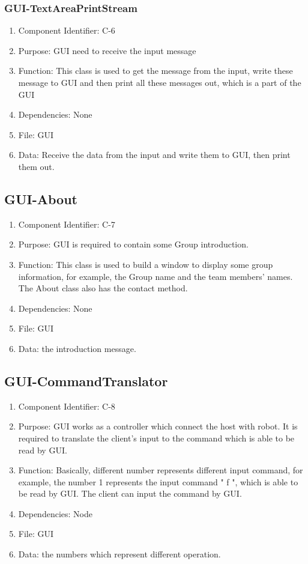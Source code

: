 \documentclass[11pt, a4paper]{report}
\begin{document}
\subsubsection{GUI-TextAreaPrintStream}
\begin{enumerate}
\item Component Identifier: C-6
\item Purpose: GUI need to receive the input message
\item Function: This class is used to get the message from the input, write these message to GUI and then print all these messages out, which is a part of the GUI
\item Dependencies: None
\item File: GUI
\item Data: Receive the data from the input and  write them to GUI, then print them out.
\end{enumerate} 

\subsection{GUI-About}
\begin{enumerate}
\item Component Identifier: C-7
\item Purpose: GUI is required to contain some Group introduction.
\item Function: This class is used to build a window to display some group information, for example, the Group name and the team members' names. The About class also has the contact method.
\item Dependencies: None
\item File: GUI
\item Data: the introduction message.
\end{enumerate}

\subsection{GUI-CommandTranslator}
\begin{enumerate}
\item Component Identifier: C-8
\item Purpose: GUI works as a controller which connect the host with robot. It is required to translate the client's input to the command which is able to be read by GUI. 
\item Function: Basically, different number represents different input command, for example, the number 1 represents the input command " f ", which is able to be read by GUI. The client can input the command by GUI. 
\item Dependencies: Node
\item File: GUI
\item Data: the numbers which represent different operation.
\end{enumerate}
\end{document}
